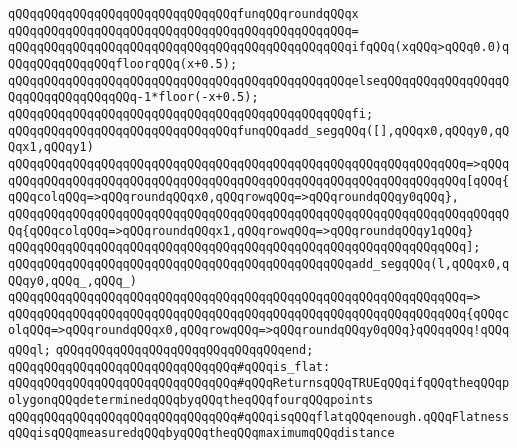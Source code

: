 \newline
\verb|qQQqqQQqqQQqqQQqqQQqqQQqqQQqqQQqfunqQQqroundqQQqx|\newline
\verb|qQQqqQQqqQQqqQQqqQQqqQQqqQQqqQQqqQQqqQQqqQQqqQQq=|\newline
\verb|qQQqqQQqqQQqqQQqqQQqqQQqqQQqqQQqqQQqqQQqqQQqqQQqifqQQq(xqQQq>qQQq0.0)qQQqqQQqqQQqqQQqfloorqQQq(x+0.5);|\newline
\verb|qQQqqQQqqQQqqQQqqQQqqQQqqQQqqQQqqQQqqQQqqQQqqQQqelseqQQqqQQqqQQqqQQqqQQqqQQqqQQqqQQqqQQq-1*floor(-x+0.5);|\newline
\verb|qQQqqQQqqQQqqQQqqQQqqQQqqQQqqQQqqQQqqQQqqQQqqQQqfi;|\newline
\newline
\verb|qQQqqQQqqQQqqQQqqQQqqQQqqQQqqQQqfunqQQqadd_segqQQq([],qQQqx0,qQQqy0,qQQqx1,qQQqy1)|\newline
\verb|qQQqqQQqqQQqqQQqqQQqqQQqqQQqqQQqqQQqqQQqqQQqqQQqqQQqqQQqqQQqqQQq=>qQQq|\newline
\verb|qQQqqQQqqQQqqQQqqQQqqQQqqQQqqQQqqQQqqQQqqQQqqQQqqQQqqQQqqQQqqQQq[qQQq{qQQqcolqQQq=>qQQqroundqQQqx0,qQQqrowqQQq=>qQQqroundqQQqy0qQQq},|\newline
\verb|qQQqqQQqqQQqqQQqqQQqqQQqqQQqqQQqqQQqqQQqqQQqqQQqqQQqqQQqqQQqqQQqqQQqqQQq{qQQqcolqQQq=>qQQqroundqQQqx1,qQQqrowqQQq=>qQQqroundqQQqy1qQQq}|\newline
\verb|qQQqqQQqqQQqqQQqqQQqqQQqqQQqqQQqqQQqqQQqqQQqqQQqqQQqqQQqqQQqqQQq];|\newline
\newline
\verb|qQQqqQQqqQQqqQQqqQQqqQQqqQQqqQQqqQQqqQQqqQQqqQQqadd_segqQQq(l,qQQqx0,qQQqy0,qQQq_,qQQq_)|\newline
\verb|qQQqqQQqqQQqqQQqqQQqqQQqqQQqqQQqqQQqqQQqqQQqqQQqqQQqqQQqqQQqqQQq=>|\newline
\verb|qQQqqQQqqQQqqQQqqQQqqQQqqQQqqQQqqQQqqQQqqQQqqQQqqQQqqQQqqQQqqQQq{qQQqcolqQQq=>qQQqroundqQQqx0,qQQqrowqQQq=>qQQqroundqQQqy0qQQq}qQQqqQQq!qQQqqQQql;|\newline
\verb|qQQqqQQqqQQqqQQqqQQqqQQqqQQqqQQqend;|\newline
\newline
\verb|qQQqqQQqqQQqqQQqqQQqqQQqqQQqqQQq#qQQqis_flat:|\newline
\verb|qQQqqQQqqQQqqQQqqQQqqQQqqQQqqQQq#qQQqReturnsqQQqTRUEqQQqifqQQqtheqQQqpolygonqQQqdeterminedqQQqbyqQQqtheqQQqfourqQQqpoints|\newline
\verb|qQQqqQQqqQQqqQQqqQQqqQQqqQQqqQQq#qQQqisqQQqflatqQQqenough.qQQqFlatnessqQQqisqQQqmeasuredqQQqbyqQQqtheqQQqmaximumqQQqdistance|\newline
